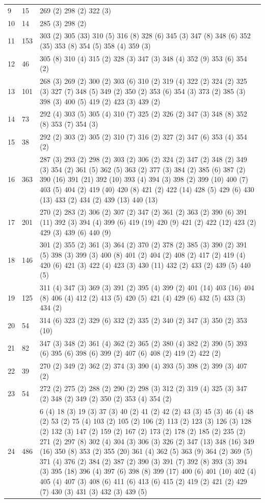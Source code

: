 \begin{landscape}
\begin{longtable}{|p{1.5cm}|p{1.25cm}|p{21cm}|}
9 & 15 & 269 (2) 298 (2) 322 (3) \\
10 & 14 & 285 (3) 298 (2) \\
11 & 153 & 303 (2) 305 (33) 310 (5) 316 (8) 328 (6) 345 (3) 347 (8) 348 (6) 352 (35) 353 (8) 354 (5) 358 (4) 359 (3) \\
12 & 46 & 305 (8) 310 (4) 315 (2) 328 (3) 347 (3) 348 (4) 352 (9) 353 (6) 354 (2) \\
13 & 101 & 268 (3) 269 (2) 300 (2) 303 (6) 310 (2) 319 (4) 322 (2) 324 (2) 325 (3) 327 (7) 348 (5) 349 (2) 350 (2) 353 (6) 354 (3) 373 (2) 385 (3) 398 (3) 400 (5) 419 (2) 423 (3) 439 (2) \\
14 & 73 & 292 (4) 303 (5) 305 (4) 310 (7) 325 (2) 326 (2) 347 (3) 348 (8) 352 (8) 353 (7) 354 (3) \\
15 & 38 & 292 (2) 303 (2) 305 (2) 310 (7) 316 (2) 327 (2) 347 (6) 353 (4) 354 (2) \\
16 & 363 & 287 (3) 293 (2) 298 (2) 303 (2) 306 (2) 324 (2) 347 (2) 348 (2) 349 (3) 354 (2) 361 (5) 362 (5) 363 (2) 377 (3) 384 (2) 385 (6) 387 (2) 390 (16) 391 (21) 392 (10) 393 (4) 394 (3) 398 (2) 399 (10) 400 (7) 403 (5) 404 (2) 419 (40) 420 (8) 421 (2) 422 (14) 428 (5) 429 (6) 430 (13) 433 (2) 434 (2) 439 (13) 440 (13) \\
17 & 201 & 270 (2) 283 (2) 306 (2) 307 (2) 347 (2) 361 (2) 363 (2) 390 (6) 391 (11) 392 (3) 394 (4) 399 (6) 419 (19) 420 (9) 421 (2) 422 (12) 423 (2) 429 (3) 439 (6) 440 (9) \\
18 & 146 & 301 (2) 355 (2) 361 (3) 364 (2) 370 (2) 378 (2) 385 (3) 390 (2) 391 (5) 398 (3) 399 (3) 400 (8) 401 (2) 404 (2) 408 (2) 417 (2) 419 (4) 420 (6) 421 (3) 422 (4) 423 (3) 430 (11) 432 (2) 433 (2) 439 (5) 440 (5) \\
19 & 125 & 311 (4) 347 (3) 369 (3) 391 (2) 395 (4) 399 (2) 401 (14) 403 (16) 404 (8) 406 (4) 412 (2) 413 (5) 420 (5) 421 (4) 429 (6) 432 (5) 433 (3) 434 (2) \\
20 & 54 & 314 (6) 323 (2) 329 (6) 332 (2) 335 (2) 340 (2) 347 (3) 350 (2) 353 (10) \\
21 & 82 & 347 (3) 348 (2) 361 (4) 362 (2) 365 (2) 380 (4) 382 (2) 390 (5) 393 (6) 395 (6) 398 (6) 399 (2) 407 (6) 408 (2) 419 (2) 422 (2) \\
22 & 39 & 270 (2) 349 (2) 362 (2) 374 (3) 390 (4) 393 (5) 398 (2) 399 (3) 407 (2) \\
23 & 54 & 272 (2) 275 (2) 288 (2) 290 (2) 298 (3) 312 (2) 319 (4) 325 (3) 347 (2) 348 (2) 349 (2) 350 (2) 353 (4) 354 (2) \\
24 & 486 & 6 (4) 18 (3) 19 (3) 37 (3) 40 (2) 41 (2) 42 (2) 43 (3) 45 (3) 46 (4) 48 (2) 53 (2) 75 (4) 103 (2) 105 (2) 106 (2) 113 (2) 123 (3) 126 (3) 128 (2) 132 (3) 147 (2) 159 (2) 167 (2) 173 (2) 178 (2) 185 (2) 235 (2) 271 (2) 297 (8) 302 (4) 304 (3) 306 (3) 326 (2) 347 (13) 348 (16) 349 (16) 350 (8) 353 (2) 355 (20) 361 (4) 362 (5) 363 (9) 364 (2) 369 (5) 371 (4) 376 (2) 384 (2) 387 (2) 390 (3) 391 (7) 392 (8) 393 (3) 394 (3) 395 (18) 396 (4) 397 (6) 398 (8) 399 (17) 400 (6) 401 (10) 402 (4) 405 (4) 407 (3) 408 (6) 411 (6) 413 (6) 415 (2) 419 (2) 421 (2) 429 (7) 430 (3) 431 (3) 432 (3) 439 (5) \\

\end{longtable}
\end{landscape}
